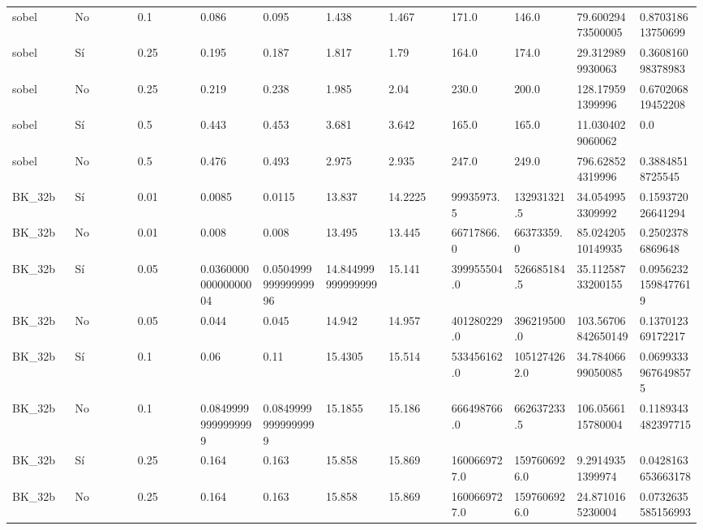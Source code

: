 {{\begin{longtable}{M{0.09\linewidth}M{0.09\linewidth}M{0.09\linewidth}M{0.09\linewidth}M{0.09\linewidth}M{0.09\linewidth}M{0.09\linewidth}M{0.09\linewidth}M{0.09\linewidth}M{0.09\linewidth}M{0.09\linewidth}}
sobel & No & \num{0.1} & \num{0.086} & \num{0.095} & \num{1.438} & \num{1.467} & \num{171.0} & \num{146.0} & \num{79.60029473500005} & \num{0.870318613750699} \\
sobel & Sí & \num{0.25} & \num{0.195} & \num{0.187} & \num{1.817} & \num{1.79} & \num{164.0} & \num{174.0} & \num{29.3129899930063} & \num{0.360816098378983} \\
sobel & No & \num{0.25} & \num{0.219} & \num{0.238} & \num{1.985} & \num{2.04} & \num{230.0} & \num{200.0} & \num{128.179591399996} & \num{0.670206819452208} \\
sobel & Sí & \num{0.5} & \num{0.443} & \num{0.453} & \num{3.681} & \num{3.642} & \num{165.0} & \num{165.0} & \num{11.0304029060062} & \num{0.0} \\
sobel & No & \num{0.5} & \num{0.476} & \num{0.493} & \num{2.975} & \num{2.935} & \num{247.0} & \num{249.0} & \num{796.628524319996} & \num{0.38848518725545} \\
BK\_32b & Sí & \num{0.01} & \num{0.0085} & \num{0.0115} & \num{13.837} & \num{14.2225} & \num{99935973.5} & \num{132931321.5} & \num{34.0549953309992} & \num{0.159372026641294} \\
BK\_32b & No & \num{0.01} & \num{0.008} & \num{0.008} & \num{13.495} & \num{13.445} & \num{66717866.0} & \num{66373359.0} & \num{85.02420510149935} & \num{0.25023786869648} \\
BK\_32b & Sí & \num{0.05} & \num{0.036000000000000004} & \num{0.050499999999999996} & \num{14.844999999999999} & \num{15.141} & \num{399955504.0} & \num{526685184.5} & \num{35.11258733200155} & \num{0.09562321598477619} \\
BK\_32b & No & \num{0.05} & \num{0.044} & \num{0.045} & \num{14.942} & \num{14.957} & \num{401280229.0} & \num{396219500.0} & \num{103.56706842650149} & \num{0.137012369172217} \\
BK\_32b & Sí & \num{0.1} & \num{0.06} & \num{0.11} & \num{15.4305} & \num{15.514} & \num{533456162.0} & \num{1051274262.0} & \num{34.78406699050085} & \num{0.06993339676498575} \\
BK\_32b & No & \num{0.1} & \num{0.08499999999999999} & \num{0.08499999999999999} & \num{15.1855} & \num{15.186} & \num{666498766.0} & \num{662637233.5} & \num{106.0566115780004} & \num{0.1189343482397715} \\
BK\_32b & Sí & \num{0.25} & \num{0.164} & \num{0.163} & \num{15.858} & \num{15.869} & \num{1600669727.0} & \num{1597606926.0} & \num{9.29149351399974} & \num{0.0428163653663178} \\
BK\_32b & No & \num{0.25} & \num{0.164} & \num{0.163} & \num{15.858} & \num{15.869} & \num{1600669727.0} & \num{1597606926.0} & \num{24.8710165230004} & \num{0.0732635585156993} \\

\end{longtable}}}
